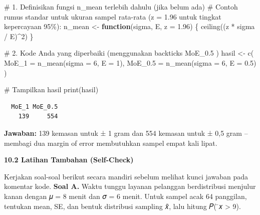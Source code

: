 \documentclass[
  indonesian,
  letterpaper,
]{book}
\newenvironment{Shaded}{\begin{snugshade}}{\end{snugshade}}
\newcommand{\AttributeTok}[1]{\textcolor[rgb]{0.40,0.45,0.13}{#1}}
\newcommand{\CommentTok}[1]{\textcolor[rgb]{0.37,0.37,0.37}{#1}}
\newcommand{\ControlFlowTok}[1]{\textcolor[rgb]{0.00,0.23,0.31}{\textbf{#1}}}
\newcommand{\DecValTok}[1]{\textcolor[rgb]{0.68,0.00,0.00}{#1}}
\newcommand{\FloatTok}[1]{\textcolor[rgb]{0.68,0.00,0.00}{#1}}
\newcommand{\FunctionTok}[1]{\textcolor[rgb]{0.28,0.35,0.67}{#1}}
\newcommand{\NormalTok}[1]{\textcolor[rgb]{0.00,0.23,0.31}{#1}}
\newcommand{\OtherTok}[1]{\textcolor[rgb]{0.00,0.23,0.31}{#1}}
\newcommand{\SpecialCharTok}[1]{\textcolor[rgb]{0.37,0.37,0.37}{#1}}
\newcommand{\StringTok}[1]{\textcolor[rgb]{0.13,0.47,0.30}{#1}}
\begin{document}
\begin{Shaded}
\begin{Highlighting}[]
\CommentTok{\# 1. Definisikan fungsi n\_mean terlebih dahulu (jika belum ada)}
\CommentTok{\# Contoh rumus standar untuk ukuran sampel rata{-}rata (z = 1.96 untuk tingkat kepercayaan 95\%):}
\NormalTok{n\_mean }\OtherTok{\textless{}{-}} \ControlFlowTok{function}\NormalTok{(sigma, E, }\AttributeTok{z =} \FloatTok{1.96}\NormalTok{) \{}
  \FunctionTok{ceiling}\NormalTok{((z }\SpecialCharTok{*}\NormalTok{ sigma }\SpecialCharTok{/}\NormalTok{ E)}\SpecialCharTok{\^{}}\DecValTok{2}\NormalTok{)}
\NormalTok{\}}

\CommentTok{\# 2. Kode Anda yang diperbaiki (menggunakan backticks \textasciigrave{}\textasciigrave{} \textasciigrave{}MoE\_0.5\textasciigrave{} \textasciigrave{}\textasciigrave{})}
\NormalTok{hasil }\OtherTok{\textless{}{-}} \FunctionTok{c}\NormalTok{(}
  \AttributeTok{MoE\_1 =} \FunctionTok{n\_mean}\NormalTok{(}\AttributeTok{sigma =} \DecValTok{6}\NormalTok{, }\AttributeTok{E =} \DecValTok{1}\NormalTok{), }
  \StringTok{\textasciigrave{}}\AttributeTok{MoE\_0.5}\StringTok{\textasciigrave{}} \OtherTok{=} \FunctionTok{n\_mean}\NormalTok{(}\AttributeTok{sigma =} \DecValTok{6}\NormalTok{, }\AttributeTok{E =} \FloatTok{0.5}\NormalTok{)}
\NormalTok{)}

\CommentTok{\# Tampilkan hasil}
\FunctionTok{print}\NormalTok{(hasil)}
\end{Highlighting}
\end{Shaded}

\begin{verbatim}
  MoE_1 MoE_0.5 
    139     554 
\end{verbatim}

\textbf{Jawaban:} 139 kemasan untuk ± 1 gram dan 554 kemasan untuk ± 0,5
gram -- membagi dua margin of error membutuhkan sampel empat kali lipat.

\textbf{10.2 Latihan Tambahan (Self-Check)}

Kerjakan soal-soal berikut secara mandiri sebelum melihat kunci jawaban
pada komentar kode. \textbf{Soal A.} Waktu tunggu layanan pelanggan
berdistribusi menjulur kanan dengan 𝜇 = 8 menit dan 𝜎 = 6 menit. Untuk
sampel acak 64 panggilan, tentukan mean, SE, dan bentuk distribusi
sampling 𝑥̄, lalu hitung 𝑃( ̄𝑥 \textgreater{} 9).
\end{document}
